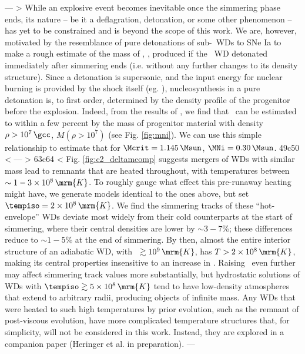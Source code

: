 ---
> While an explosive event becomes inevitable once the simmering phase ends, its nature -- be it a deflagration, detonation, or some other phenomenon -- has yet to be constrained and is beyond the scope of this work.  We are, however, motivated by the resemblance of pure detonations of sub-\Mch\ WDs to SNe Ia to make a rough estimate of the mass of \Ni, \MNi, produced if the \Mcrit\ WD detonated immediately after simmering ends (i.e. without any further changes to its density structure).  Since a detonation is supersonic, and the input energy for nuclear burning is provided by the shock itself (eg. \citealt{seit+09}), nucleosynthesis in a pure detonation is, to first order, determined by the density profile of the progenitor before the explosion.  Indeed, from the results of \cite{sim+10}, we find that \MNi\ can be estimated to within a few percent by the mass of progenitor material with density $\rho>10^7\,\gcc$, $M(\rho>10^7)$ (see Fig. \ref{fig:mni}).  We can use this simple relationship to estimate that for $\Mcrit = 1.145\,\Msun$, $\MNi = 0.30\,\Msun$.  
49c50
< \label{sssec:c5_runaway_ad_hot}
---
> \label{sssec:runaway_ad_hot}
63c64
< Fig. \ref{fig:c2_deltamcomp} suggests mergers of WDs with similar mass lead to remnants that are heated throughout, with temperatures between $\sim 1 - 3\times10^8\,\mrm{K}$.  To roughly gauge what effect this pre-runaway heating might have, we generate models identical to the ones above, but set $\tempiso = 2\times10^8\,\mrm{K}$.  We find the simmering tracks of these ``hot-envelope'' WDs deviate most widely from their cold counterparts at the start of simmering, where their central densities are lower by $\sim3-7$\%; these differences reduce to $\sim1 - 5$\% at the end of simmering.  By then, almost the entire interior structure of an adiabatic WD, with \Tc\ $\gtrsim10^9\,\mrm{K}$, has $T > 2\times10^8\,\mrm{K}$, making its central properties insensitive to an increase in \tempiso.  Raising \tempiso\ even further may affect simmering track values more substantially, but hydrostatic solutions of WDs with $\tempiso \gtrsim 5\times10^8\,\mrm{K}$ tend to have low-density atmospheres that extend to arbitrary radii, producing objects of infinite mass.  Any WDs that were heated to such high temperatures by prior evolution, such as the remnant of \cite{ji+13} post-viscous evolution, have more complicated temperature structures that, for simplicity, will not be considered in this work.  Instead, they are explored in a companion paper (Heringer et al. in preparation).
---
